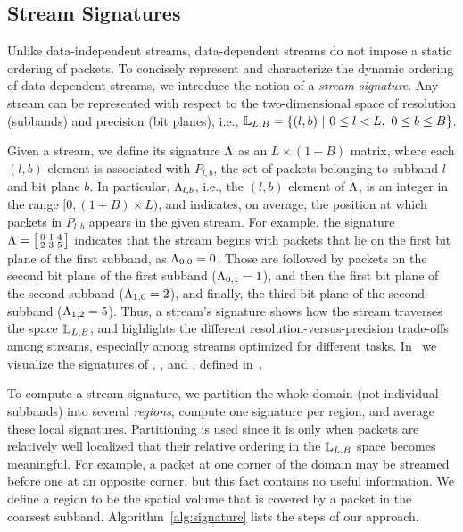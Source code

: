 \subsection{Stream Signatures} \label{sec:stream-signature}

Unlike data-independent streams, data-dependent streams do not impose a static ordering of packets.
To concisely represent and characterize the dynamic ordering of data-dependent streams, we introduce
the notion of a \emph{stream signature}. Any stream can be represented with respect to the
two-dimensional space of resolution (subbands) and precision (bit
planes), i.e., \mbox{${\mathbb L}_{L,B}=\{(l,b)\ |\ 0\leq l < L,\ 0\leq b \leq B\}$.}

Given a stream, we define its signature $\sgn$ as an $L \times (1+B)$ matrix, where each $(l,b)$
element is associated with $P_{l,b}$, the set of packets belonging to subband $l$ and bit plane
$b$. In particular, $\sgn_{l,b}$, i.e., the $(l,b)$ element of $\sgn$, is an integer in the range
$[0, (1+B)\times L)$, and indicates, on average, the position at which packets in $P_{l,b}$ appears
in the given stream. For example, the signature $\sgn=\bigl[ \begin{smallmatrix}0 & 1 & 4\\
2 & 3 & 5\end{smallmatrix}\bigr]$ indicates that the stream begins with packets that lie on the
first bit plane of the first subband, as $\sgn_{0,0}=0$. Those are followed by packets on the second
bit plane of the first subband ($\sgn_{0,1}=1$), and then the first bit plane of the second subband
($\sgn_{1,0}=2$), and finally, the third bit plane of the second subband ($\sgn_{1,2}=5$). Thus, a
stream's signature shows how the stream traverses the space ${\mathbb L}_{L,B}$, and highlights the
different resolution-versus-precision trade-offs among streams, especially among \sopt streams
optimized for different tasks. In~ we visualize the signatures of
\sbit, \slvl, and \swav, defined in~.

To compute a stream signature, we partition the whole domain (not individual subbands) into several
\emph{regions}, compute one signature per region, and average these local signatures. Partitioning
is used since it is only when packets are relatively well localized that their relative ordering in
the ${\mathbb L}_{L,B}$ space becomes meaningful. For example, a packet at one corner of the domain may
be streamed before one at an opposite corner, but this fact contains no useful information. We
define a region to be the spatial volume that is covered by a packet in the coarsest subband.
Algorithm~\ref{alg:signature} lists the steps of our approach.

